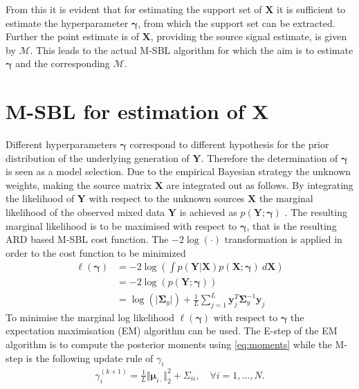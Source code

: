 From this it is evident that for estimating the support set of $\textbf{X}$ it is sufficient to estimate the hyperparameter $\boldsymbol{\gamma}$, from which the support set can be extracted. Further the point estimate is of $\textbf{X}$, providing the source signal estimate, is given by $\mathcal{M}$\cite[p. 147]{phd_wipf}. 
This leads to the actual M-SBL algorithm for which the aim is to estimate $\boldsymbol{\gamma}$ and the corresponding $\mathcal{M}$.

\section{M-SBL for estimation of $\textbf{X}$}
Different hyperparameters $\boldsymbol{\gamma}$ correspond to different hypothesis for the prior distribution of the underlying generation of $\mathbf{Y}$. Therefore the determination of $\boldsymbol{\gamma}$ is seen as a model selection.
Due to the empirical Bayesian strategy the unknown weights, making the source matrix $\textbf{X}$ are integrated out as follows.
By integrating the likelihood of $\textbf{Y}$ with respect to the unknown sources $\mathbf{X}$ the marginal likelihood of the observed mixed data $\mathbf{Y}$ is achieved as $p (\mathbf{Y} ; \boldsymbol{\gamma})$ \cite[p. 146]{phd_wipf}. 
The resulting marginal likelihood is to be maximised with respect to $\boldsymbol{\gamma}$, that is the resulting ARD based M-SBL cost function.
The $-2 \log (\cdot)$ transformation is applied in order to the cost function to be minimized
\begin{align*}
\ell(\boldsymbol{\gamma}) &= -2 \log \left( \int p (\mathbf{Y}  \vert \mathbf{X}) p (\mathbf{X} ; \boldsymbol{\gamma}) \ d\mathbf{X} \right) \\
&= - 2 \log(p (\mathbf{Y} ; \boldsymbol{\gamma}))\\
&= \log ( \vert \boldsymbol{\Sigma}_y \vert) + \frac{1}{L} \sum_{j=1}^L \mathbf{y}_{j}^T \boldsymbol{\Sigma}_y ^{-1} \mathbf{y}_{j}
\end{align*}
To minimise the marginal log likelihood $\ell(\boldsymbol{\gamma})$ with respect to $\boldsymbol{\gamma}$ the expectation maximisation (EM) algorithm can be used. 
The E-step of the EM algorithm is to compute the posterior moments using \eqref{eq:moments} while the M-step is the following update rule of $\gamma_i$\cite[p.147]{phd_wipf}
\begin{align*}
\gamma_i^{(k+1)} = \frac{1}{L} \Vert \boldsymbol{\mu}_{i \cdot} \Vert_2^2 + \Sigma_{ii}, \quad \forall i = 1, \dots, N.
\end{align*}
